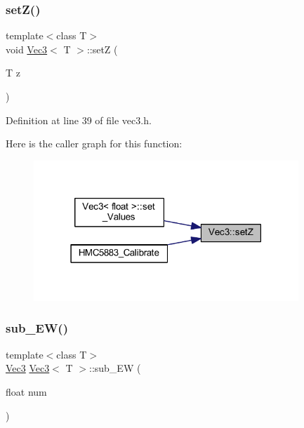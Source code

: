 \subsubsection{\texorpdfstring{setZ()}{setZ()}}
{\footnotesize\ttfamily template$<$class T$>$ \\
void \mbox{\hyperlink{class_vec3}{Vec3}}$<$ T $>$\+::setZ (\begin{DoxyParamCaption}\item[{T}]{z }\end{DoxyParamCaption})\hspace{0.3cm}{\ttfamily [inline]}}



Definition at line 39 of file vec3.\+h.

Here is the caller graph for this function\+:
\nopagebreak
\begin{figure}[H]
\begin{center}
\leavevmode
\includegraphics[width=283pt]{class_vec3_a334f510fc72e3ae8cf50f61429db307a_icgraph}
\end{center}
\end{figure}
\mbox{\label{class_vec3_acf3960c03e110918c0240f8415d6a7c9}} 
\subsubsection{\texorpdfstring{sub\_EW()}{sub\_EW()}\hspace{0.1cm}{\footnotesize\ttfamily [1/2]}}
{\footnotesize\ttfamily template$<$class T$>$ \\
\mbox{\hyperlink{class_vec3}{Vec3}} \mbox{\hyperlink{class_vec3}{Vec3}}$<$ T $>$\+::sub\+\_\+\+EW (\begin{DoxyParamCaption}\item[{float}]{num }\end{DoxyParamCaption})\hspace{0.3cm}{\ttfamily [inline]}}




